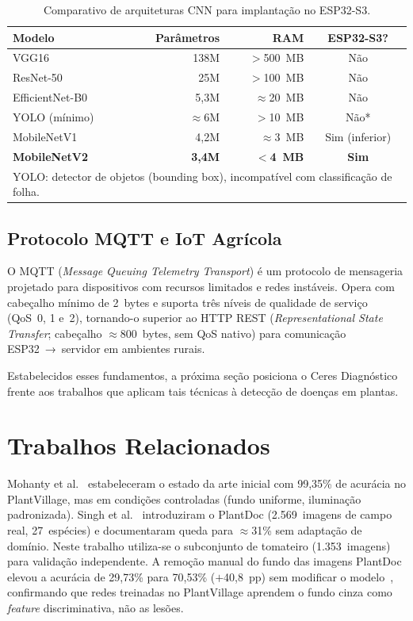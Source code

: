 \documentclass[12pt]{article}
\begin{document}
\begin{table}[ht]
\centering
\caption{Comparativo de arquiteturas CNN para implantação no ESP32-S3.}
\label{tab:modelos}
\begin{tabular}{@{}lrrc@{}}
\toprule
\textbf{Modelo} & \textbf{Parâmetros} & \textbf{RAM} & \textbf{ESP32-S3?} \\
\midrule
VGG16           & 138M  & $>$500~MB       & Não \\
ResNet-50       & 25M   & $>$100~MB       & Não \\
EfficientNet-B0 & 5,3M  & $\approx$20~MB  & Não \\
YOLO (mínimo)   & $\approx$6M & $>$10~MB  & Não* \\
MobileNetV1     & 4,2M  & $\approx$3~MB   & Sim (inferior) \\
\textbf{MobileNetV2} & \textbf{3,4M} & \textbf{$<$4~MB} & \textbf{Sim} \\
\bottomrule
\multicolumn{4}{l}{\footnotesize *YOLO: detector de objetos (bounding box),
incompatível com classificação de folha.}
\end{tabular}
\end{table}

\subsection{Protocolo MQTT e IoT Agrícola}

O MQTT (\textit{Message Queuing Telemetry Transport}) \cite{oasis2019} é um
protocolo de mensageria projetado para dispositivos com recursos limitados e redes
instáveis. Opera com cabeçalho mínimo de 2~bytes e suporta três níveis de
qualidade de serviço (QoS~0, 1 e~2), tornando-o superior ao HTTP REST
(\textit{Representational State Transfer}; cabeçalho $\approx$800~bytes, sem QoS
nativo) para comunicação ESP32~→~servidor em ambientes rurais.

Estabelecidos esses fundamentos, a próxima seção posiciona o Ceres Diagnóstico
frente aos trabalhos que aplicam tais técnicas à detecção de doenças em plantas.


\section{Trabalhos Relacionados}
\label{sec:relacionados}

Mohanty et al.~\cite{mohanty2016} estabeleceram o estado da arte inicial com 99,35\%
de acurácia no PlantVillage, mas em condições controladas (fundo uniforme,
iluminação padronizada). Singh et al.~\cite{singh2020} introduziram o PlantDoc
(2.569~imagens de campo real, 27~espécies) e documentaram queda para
$\approx$31\% sem adaptação de domínio. Neste trabalho utiliza-se o subconjunto de
tomateiro (1.353~imagens) para validação independente. A remoção manual do fundo
das imagens PlantDoc elevou a acurácia de 29,73\% para 70,53\% ($+$40,8~pp) sem
modificar o modelo~\cite{singh2020}, confirmando que redes treinadas no PlantVillage
aprendem o fundo cinza como \textit{feature} discriminativa, não as lesões.
\end{document}
